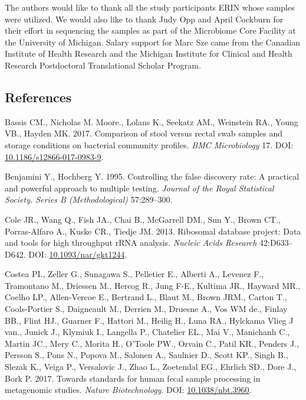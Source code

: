 \documentclass[12pt,]{article}
\begin{document}
The authors would like to thank all the study participants ERIN whose
samples were utilized. We would also like to thank Judy Opp and April
Cockburn for their effort in sequencing the samples as part of the
Microbiome Core Facility at the University of Michigan. Salary support
for Marc Sze came from the Canadian Institute of Health Research and the
Michigan Institute for Clinical and Health Research Postdoctoral
Translational Scholar Program.

\newpage

\subsection{References}\label{references}

\hypertarget{refs}{}
\hypertarget{ref-storage_Bassis_2017}{}
Bassis CM., Nicholas M. Moore., Lolans K., Seekatz AM., Weinstein RA.,
Young VB., Hayden MK. 2017. Comparison of stool versus rectal swab
samples and storage conditions on bacterial community profiles.
\emph{BMC Microbiology} 17. DOI:
\href{https://doi.org/10.1186/s12866-017-0983-9}{10.1186/s12866-017-0983-9}.

\hypertarget{ref-benjamini_controlling_1995}{}
Benjamini Y., Hochberg Y. 1995. Controlling the false discovery rate: A
practical and powerful approach to multiple testing. \emph{Journal of
the Royal Statistical Society. Series B (Methodological)} 57:289--300.

\hypertarget{ref-rdp_Cole_2013}{}
Cole JR., Wang Q., Fish JA., Chai B., McGarrell DM., Sun Y., Brown CT.,
Porras-Alfaro A., Kuske CR., Tiedje JM. 2013. Ribosomal database
project: Data and tools for high throughput rRNA analysis. \emph{Nucleic
Acids Research} 42:D633--D642. DOI:
\href{https://doi.org/10.1093/nar/gkt1244}{10.1093/nar/gkt1244}.

\hypertarget{ref-metagenomcis_bias_Costea_2017}{}
Costea PI., Zeller G., Sunagawa S., Pelletier E., Alberti A., Levenez
F., Tramontano M., Driessen M., Hercog R., Jung F-E., Kultima JR.,
Hayward MR., Coelho LP., Allen-Vercoe E., Bertrand L., Blaut M., Brown
JRM., Carton T., Cools-Portier S., Daigneault M., Derrien M., Druesne
A., Vos WM de., Finlay BB., Flint HJ., Guarner F., Hattori M., Heilig
H., Luna RA., Hylckama Vlieg J van., Junick J., Klymiuk I., Langella P.,
Chatelier EL., Mai V., Manichanh C., Martin JC., Mery C., Morita H.,
O'Toole PW., Orvain C., Patil KR., Penders J., Persson S., Pons N.,
Popova M., Salonen A., Saulnier D., Scott KP., Singh B., Slezak K.,
Veiga P., Versalovic J., Zhao L., Zoetendal EG., Ehrlich SD., Dore J.,
Bork P. 2017. Towards standards for human fecal sample processing in
metagenomic studies. \emph{Nature Biotechnology}. DOI:
\href{https://doi.org/10.1038/nbt.3960}{10.1038/nbt.3960}.
\end{document}
